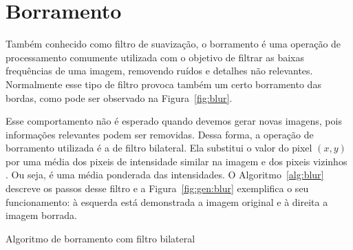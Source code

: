

\section{Borramento}

Também conhecido como filtro de suavização, o borramento é uma operação de processamento comumente utilizada com o objetivo de filtrar as baixas frequências de uma imagem, removendo ruídos e detalhes não relevantes. Normalmente esse tipo de filtro provoca também um certo borramento das bordas, como pode ser observado na Figura~\ref{fig:blur}.

Esse comportamento não é esperado quando devemos gerar novas imagens, pois informações relevantes podem ser removidas. Dessa forma, a operação de borramento utilizada é a de filtro bilateral. Ela substitui o valor do pixel $(x,y)$ por uma média dos pixeis de intensidade similar na imagem e dos pixeis vizinhos \cite{Tomasi1998}. Ou seja, é uma média ponderada das intensidades. O Algoritmo~\ref{alg:blur} descreve os passos desse filtro e a Figura~\ref{fig:gen:blur} exemplifica o seu funcionamento: à esquerda está demonstrada a imagem original e à direita a imagem borrada.

\vspace{0.5cm}
\begin{algorithm}[H]
  \caption{Algoritmo de borramento com filtro bilateral}
  \label{alg:blur}
  \SetAlgoLined


\end{algorithm}
\vspace{0.5cm}

